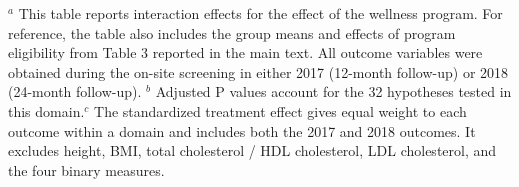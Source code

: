 \documentclass{article}
\begin{document}
\begin{landscape}
\begin{table}[tbp]
{\begin{tabularx}{\linewidth}{lCClCClCC}
\end{tabularx}
\begin{flushleft}
\tiny $^{a}$ This table reports interaction effects for the effect of the wellness program. For reference, the table also includes the group means and effects of program eligibility from Table 3 reported in the main text. All outcome variables were obtained during the on-site screening in either 2017 (12-month follow-up) or 2018 (24-month follow-up). \newline $^{b}$ Adjusted P values account for the 32 hypotheses tested in this domain.\newline $^{c}$ The standardized treatment effect gives equal weight to each outcome within a domain and includes both the 2017 and 2018 outcomes. It excludes height, BMI, total cholesterol / HDL cholesterol, LDL cholesterol, and the four binary measures.
\end{flushleft}
}
\end{table}
\end{landscape}
\end{document}
